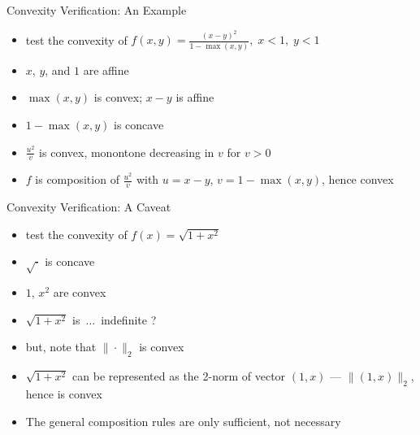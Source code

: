\documentclass[10pt]{beamer}
\newcommand{\ds}{\displaystyle}
\theoremstyle{definition}
\begin{document}
\begin{frame}{Convexity Verification: An Example}
  \begin{itemize}
    \item test the convexity of $\ds f(x, y) = \frac{(x - y)^2}{1 - \max(x, y)}, \; x < 1,\;y < 1$
    \item $x$, $y$, and $1$ are affine
    \item $\max(x, y)$ is convex; $x - y$ is affine
    \item $1 - \max(x, y)$ is concave
    \item $\ds\frac{u^2}{v}$ is convex, monontone decreasing in $v$ for $v > 0$
    \item $f$ is composition of $\ds\frac{u^2}{v}$ with $u = x - y$, $v = 1 - \max(x, y)$, hence convex
  \end{itemize}
\end{frame}

\begin{frame}{Convexity Verification: A Caveat}
  \begin{itemize}
    \item test the convexity of $\ds f(x) = \sqrt{1 + x^2}$
    \item $\sqrt{\cdot}$ is concave 
    \item $1$, $x^2$ are convex 
    \item $\sqrt{1 + x^2}$ is $\,\ldots\,$ indefinite ?
    \item but, note that $\ds\|\cdot\|_2$ is convex
    \item $\ds\sqrt{1 + x^2}$ can be represented as the 2-norm of vector $(1, x)$ --- $\ds\|(1, x)\|_2$, hence is convex
    \item The general composition rules are only sufficient, not necessary
  \end{itemize}
\end{frame}
\end{document}
